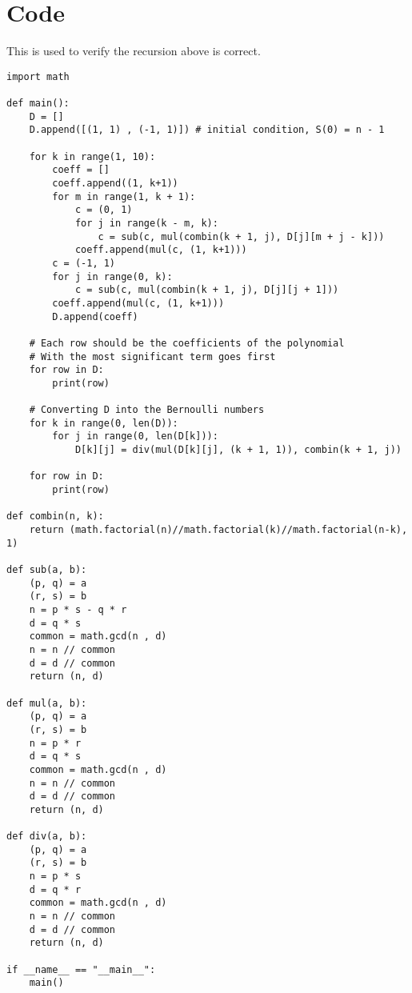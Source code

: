 \documentclass{article}
\begin{document}
\section{Code}
This is used to verify the recursion above is correct.
\begin{verbatim}
import math

def main():
    D = []
    D.append([(1, 1) , (-1, 1)]) # initial condition, S(0) = n - 1

    for k in range(1, 10):
        coeff = []
        coeff.append((1, k+1))
        for m in range(1, k + 1):
            c = (0, 1)
            for j in range(k - m, k):
                c = sub(c, mul(combin(k + 1, j), D[j][m + j - k]))
            coeff.append(mul(c, (1, k+1)))
        c = (-1, 1)
        for j in range(0, k):
            c = sub(c, mul(combin(k + 1, j), D[j][j + 1]))
        coeff.append(mul(c, (1, k+1)))
        D.append(coeff)

    # Each row should be the coefficients of the polynomial
    # With the most significant term goes first
    for row in D:
        print(row)

    # Converting D into the Bernoulli numbers
    for k in range(0, len(D)):
        for j in range(0, len(D[k])):
            D[k][j] = div(mul(D[k][j], (k + 1, 1)), combin(k + 1, j))

    for row in D:
        print(row)

def combin(n, k):
    return (math.factorial(n)//math.factorial(k)//math.factorial(n-k), 1)

def sub(a, b):
    (p, q) = a
    (r, s) = b
    n = p * s - q * r
    d = q * s
    common = math.gcd(n , d)
    n = n // common
    d = d // common
    return (n, d)

def mul(a, b):
    (p, q) = a
    (r, s) = b
    n = p * r
    d = q * s
    common = math.gcd(n , d)
    n = n // common
    d = d // common
    return (n, d)

def div(a, b):
    (p, q) = a
    (r, s) = b
    n = p * s
    d = q * r
    common = math.gcd(n , d)
    n = n // common
    d = d // common
    return (n, d)

if __name__ == "__main__":
    main()
\end{verbatim}
\end{document}
